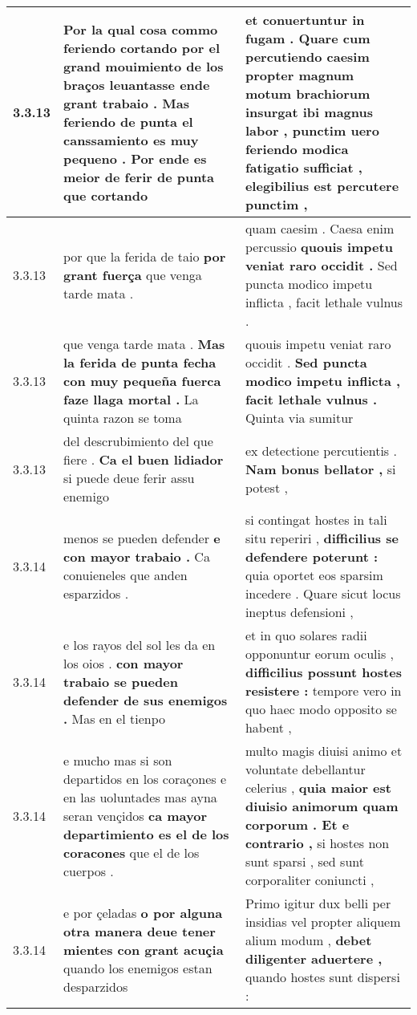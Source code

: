 \begin{tabular}{|p{1cm}|p{6.5cm}|p{6.5cm}|}
3.3.13 & Por la qual cosa commo feriendo cortando \textbf{ por el grand mouimiento de los braços leuantasse ende grant trabaio . } Mas feriendo de punta el canssamiento es muy pequeno . Por ende es meior de ferir de punta que cortando & et conuertuntur in fugam . \textbf{ Quare cum percutiendo caesim propter magnum motum brachiorum insurgat ibi magnus labor , } punctim uero feriendo modica fatigatio sufficiat , elegibilius est percutere punctim , \\\hline
3.3.13 & por que la ferida de taio \textbf{ por grant fuerça } que venga tarde mata . & quam caesim . Caesa enim percussio \textbf{ quouis impetu veniat raro occidit . } Sed puncta modico impetu inflicta , facit lethale vulnus . \\\hline
3.3.13 & que venga tarde mata . \textbf{ Mas la ferida de punta fecha con muy pequeña fuerca faze llaga mortal . } La quinta razon se toma & quouis impetu veniat raro occidit . \textbf{ Sed puncta modico impetu inflicta , facit lethale vulnus . } Quinta via sumitur \\\hline
3.3.13 & del descrubimiento del que fiere . \textbf{ Ca el buen lidiador } si puede deue ferir assu enemigo & ex detectione percutientis . \textbf{ Nam bonus bellator , } si potest , \\\hline
3.3.14 & menos se pueden defender \textbf{ e con mayor trabaio . } Ca conuieneles que anden esparzidos . & si contingat hostes in tali situ reperiri , \textbf{ difficilius se defendere poterunt : } quia oportet eos sparsim incedere . Quare sicut locus ineptus defensioni , \\\hline
3.3.14 & e los rayos del sol les da en los oios . \textbf{ con mayor trabaio se pueden defender de sus enemigos . } Mas en el tienpo & et in quo solares radii opponuntur eorum oculis , \textbf{ difficilius possunt hostes resistere : } tempore vero in quo haec modo opposito se habent , \\\hline
3.3.14 & e mucho mas si son departidos en los coraçones e en las uoluntades mas ayna seran vençidos \textbf{ ca mayor departimiento es el de los coracones } que el de los cuerpos . & multo magis diuisi animo et voluntate debellantur celerius , \textbf{ quia maior est diuisio animorum quam corporum . Et e contrario , } si hostes non sunt sparsi , sed sunt corporaliter coniuncti , \\\hline
3.3.14 & e por çeladas \textbf{ o por alguna otra manera deue tener mientes con grant acuçia } quando los enemigos estan desparzidos & Primo igitur dux belli per insidias vel propter aliquem alium modum , \textbf{ debet diligenter aduertere , } quando hostes sunt dispersi : \\\hline

\end{tabular}
